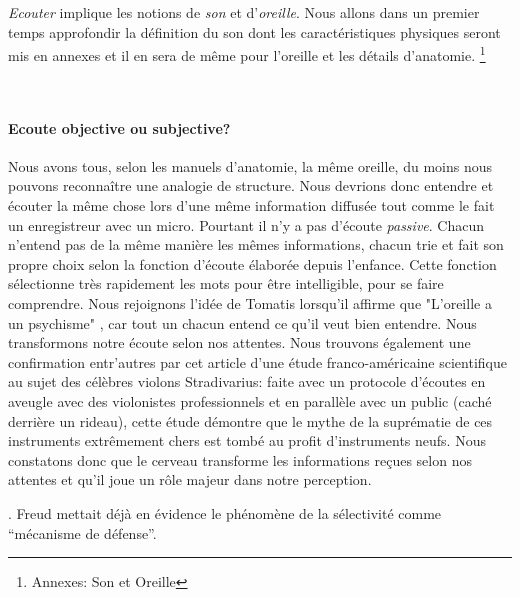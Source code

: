  
\emph{Ecouter} implique les notions de \emph{son} et
d'\emph{oreille}. Nous allons dans un premier temps approfondir  la
définition du son dont les caractéristiques physiques seront mis en
annexes et il en sera de même pour l'oreille et les détails
d'anatomie. \footnote{Annexes: Son et Oreille}

\







\paragraph{Ecoute objective ou subjective?}

Nous avons tous,
selon les manuels d'anatomie, la même
oreille, du moins nous pouvons reconnaître une analogie de structure. Nous devrions donc entendre et écouter la même chose
lors d'une même information diffusée tout comme le fait un enregistreur avec un micro. Pourtant il n'y a pas d'écoute \emph{passive}. Chacun n'entend pas de la même manière les mêmes
informations, chacun trie et fait son propre choix selon la fonction
d'écoute élaborée depuis l'enfance. Cette fonction sélectionne très
rapidement les mots pour être intelligible, pour se faire
comprendre. Nous rejoignons l'idée de Tomatis lorsqu'il affirme que
"L'oreille a un psychisme" , car tout un chacun entend ce qu'il veut bien
entendre. \autocite{tomatis_oreille_1998} 
Nous transformons notre écoute selon nos attentes. Nous trouvons
également une confirmation entr'autres par cet 
article d'une 
étude franco-américaine scientifique
\autocite{fritz_stradivarius} au sujet des célèbres violons
Stradivarius: faite avec un protocole 
d'écoutes en aveugle avec
des violonistes professionnels et en parallèle avec un public (caché
derrière un rideau), cette étude démontre que le mythe de la suprématie
de ces instruments extrêmement chers est tombé au profit d'instruments
neufs. Nous constatons donc que le cerveau 
transforme les informations reçues selon nos attentes et qu'il joue un
rôle majeur dans notre perception.

\autocite{lemonde.fr:stradivarius}.
% 
\autocite[p. 43]{roque:lecoute}
 Freud mettait déjà en évidence le phénomène de la
sélectivité comme ``mécanisme de défense''. \autocite{S.Freud,
  Psychologie de la vie quotidienne, 1904}

